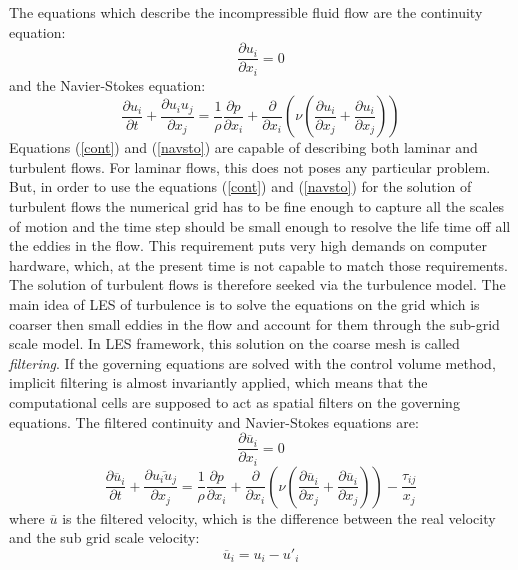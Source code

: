 \documentclass[10pt]{article}
\newcommand*{\p}{\partial}
\newcommand*{\ol}{\overline}
\begin{document}
    The equations which describe the incompressible fluid flow
    are the continuity equation:
    \begin{equation}
    \frac{\p u_i}{\p x_i}=0
    \label{cont}
    \end{equation}
    and the Navier-Stokes equation:
    \begin{equation}
    \frac{\p u_i}{\p t}+
    \frac{\p u_i u_j}{\p x_j}=
    \frac{1}{\rho}\frac{\p p}{\p x_i} + 
    \frac{\p}{\p x_i}(\nu (\frac{\p u_i}{\p x_j}+\frac{\p u_i}{\p x_j}))
    \label{navsto}
    \end{equation}
    Equations (\ref{cont}) and (\ref{navsto}) are capable of describing
    both laminar and turbulent flows. For laminar flows, this does not
    poses any particular problem. But, in order to use the equations 
    (\ref{cont}) and (\ref{navsto}) for the solution of turbulent flows
    the numerical grid has to be fine enough to capture all the scales
    of motion and the time step should be small enough to resolve the
    life time off all the eddies in the flow. This requirement puts very
    high demands on computer hardware, which, at the present time is 
    not capable to match those requirements. The solution of turbulent
    flows is therefore seeked via the turbulence model. The main idea
    of LES of turbulence is to solve the equations on the grid which 
    is coarser then small eddies in the flow and account for them through
    the sub-grid scale model. In LES framework, this solution on the
    coarse mesh is called {\em filtering}. If the governing equations
    are solved with the control volume method, implicit filtering is 
    almost invariantly applied, which means that the computational
    cells are supposed to act as spatial filters on the governing
    equations. The filtered continuity and Navier-Stokes equations
    are:
    \begin{equation}
    \frac{\p \ol{u}_i}{\p x_i}=0
    \label{fcont}
    \end{equation}
    \begin{equation}
    \frac{\p \ol{u}_i}{\p t}+
    \frac{\p \ol{u_i u_j}}{\p x_j}=
    \frac{1}{\rho}\frac{\p p}{\p x_i} + 
    \frac{\p}{\p x_i}(\nu (\frac{\p \ol{u}_i}{\p x_j}+\frac{\p \ol{u}_i}{\p x_j}))
    -\frac{\tau_{ij}}{x_j}
    \label{fnavsto}
    \end{equation}
    where $\ol{u}$ is the filtered velocity, which is the difference
    between the real velocity and the sub grid scale velocity:
    \begin{equation}
    \ol{u}_i = u_i - u'_i
    \end{equation}
\end{document}
